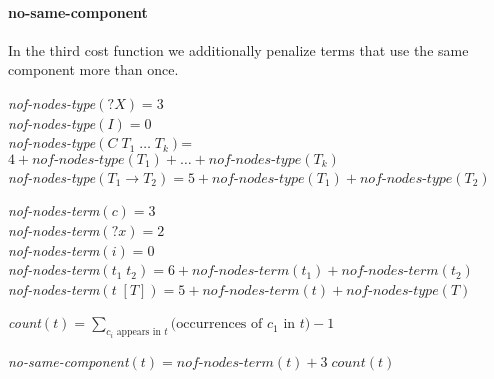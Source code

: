  \paragraph{no-same-component}
In the third cost function we additionally penalize terms that use the same component more than once.
%
\begin{algorithm*}

\textit{nof-nodes-type}$({?X}) = 3$\\
\textit{nof-nodes-type}$(I) = 0$\\
\textit{nof-nodes-type}$(C\; T_1\; \ldots\; T_k)$= $4 + \textit{nof-nodes-type}(T_1) + \ldots + \textit{nof-nodes-type}(T_k)$\\
\textit{nof-nodes-type}$(T_1 \rightarrow T_2) = 5 + \textit{nof-nodes-type}(T_1) + \textit{nof-nodes-type}(T_2)$\\

\BlankLine

\textit{nof-nodes-term}$(c) = 3$\\
\textit{nof-nodes-term}$({?x}) = 2$\\
\textit{nof-nodes-term}$(i) = 0$\\
\textit{nof-nodes-term}$(t_1\; t_2) = 6 + \textit{nof-nodes-term}(t_1) + \textit{nof-nodes-term}(t_2)$\\
\textit{nof-nodes-term}$(t\; [T]) = 5 + \textit{nof-nodes-term}(t) + \textit{nof-nodes-type}(T)$\\

\BlankLine

\textit{count}$(t) = \displaystyle \sum_{c_i \text{ appears in } t} \text{(occurrences of $c_1$ in $t$)} - 1$\\

\BlankLine

\textit{no-same-component}$(t) = \textit{nof-nodes-term}(t) + 3\; \textit{count}(t)$
\end{algorithm*} 
%

